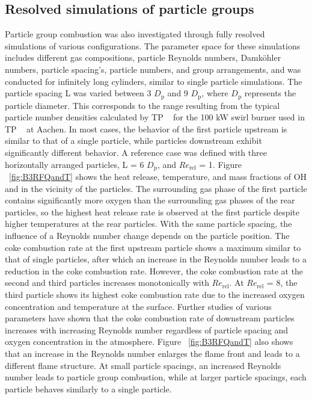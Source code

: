 \begin{btUnit}
\subsection{Resolved simulations of particle groups}
Particle group combustion was also investigated through fully resolved simulations of various configurations. The parameter space for these simulations includes different gas compositions, particle Reynolds numbers, Damk\"ohler numbers, particle spacing's, particle numbers, and group arrangements, and was conducted for infinitely long cylinders, similar to single particle simulations. The particle spacing L was varied between 3 $D_\mathrm{p}$ and 9 $D_\mathrm{p}$, where $D_\mathrm{p}$ represents the particle diameter. This corresponds to the range resulting from the typical particle number densities calculated by TP ~ for the 100 kW swirl burner used in TP ~ at Aachen. In most cases, the behavior of the first particle upstream is similar to that of a single particle, while particles downstream exhibit significantly different behavior. A reference case was defined with three horizontally arranged particles, L = 6 $D_\mathrm{p}$, and $Re_\mathrm{rel}$ = 1. Figure ~\ref{fig:B3RFQandT} shows the heat release, temperature, and mass fractions of OH and  in the vicinity of the particles. The surrounding gas phase of the first particle contains significantly more oxygen than the surrounding gas phases of the rear particles, so the highest heat release rate is observed at the first particle despite higher temperatures at the rear particles. With the same particle spacing, the influence of a Reynolds number change depends on the particle position. The coke combustion rate at the first upstream particle shows a maximum similar to that of single particles, after which an increase in the Reynolds number leads to a reduction in the coke combustion rate. However, the coke combustion rate at the second and third particles increases monotonically with $Re_\mathrm{rel}$. At $Re_\mathrm{rel}$ = 8, the third particle shows its highest coke combustion rate due to the increased oxygen concentration and temperature at the surface. Further studies of various parameters have shown that the coke combustion rate of downstream particles increases with increasing Reynolds number regardless of particle spacing and oxygen concentration in the atmosphere. Figure ~\ref{fig:B3RFQandT} also shows that an increase in the Reynolds number enlarges the flame front and leads to a different flame structure. At small particle spacings, an increased Reynolds number leads to particle group combustion, while at larger particle spacings, each particle behaves similarly to a single particle.

\end{btUnit}
